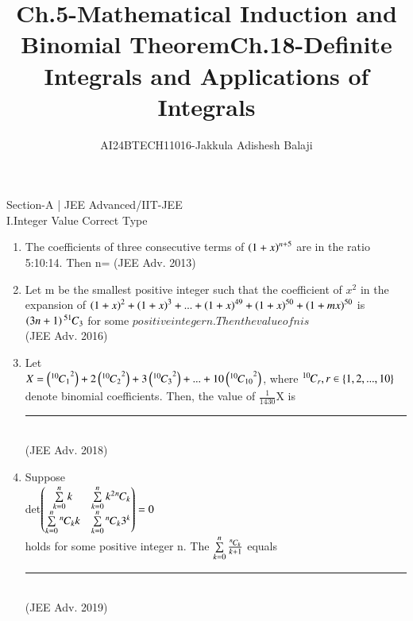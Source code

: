 \documentclass[journal]{IEEEtran}
\begin{document}

\title{Ch.5-Mathematical Induction and Binomial Theorem}
\author{AI24BTECH11016-Jakkula Adishesh Balaji}
{\let\newpage\relax\maketitle}
\renewcommand{\thefigure}{\theenumi}
\renewcommand{\thetable}{\theenumi}
\setlength{\intextsep}{10pt} %
\renewcommand{\thetable}{\theenumi}
Section-A | JEE Advanced/IIT-JEE\\
 I.Integer Value Correct Type
\begin{enumerate}
        \item
            The coefficients of three consecutive terms of $\left(1+x\right)^{n+5}$ are in the ratio 5:10:14. Then n=       
                     \hfill(JEE Adv. 2013)
        \item
            Let m be the smallest positive integer such that the coefficient of $x^{2}$ in the expansion of $\left(1+x\right)^{2} + \left(1+x\right)^{3} + ... + \left(1+x\right)^{49} + \left(1+x\right)^{50} + \left(1+mx\right)^{50}$ is $\left(3n+1\right) {{}^{51}\mkern-1muC_{3}}$ for some $positive integer n. Then the value of n is$ \\
                     \hfill(JEE Adv. 2016)
        \item
            Let \\ $X= \left({{}^{10}\mkern-1muC_{1}}^{2}\right)+2\left({{}^{10}\mkern-1muC_{2}}^{2}\right) + 3\left({{}^{10}\mkern-1muC_{3}}^{2}\right) + ... + 10\left({{}^{10}\mkern-1muC_{10}}^{2}\right)$, where ${{}^{10}\mkern-1muC_{r}} , r \in \left\{1,2,...,10\right\}$ denote binomial coefficients. Then, the value of $\frac{1}{1430}$X is \rule{10mm}{0.15mm} \\
                    \hfill(JEE Adv. 2018)
        \item
        Suppose \\
           det$\begin{pmatrix} \sum\limits_{k=0}^{n}k & \sum\limits_{k=0}^{n} k^{2} {{}^{n}\mkern-1muC_{k}} \\ \sum\limits_{k=0}^{n}{{}^{n}\mkern-1muC_{k}} k & \sum\limits_{k=0}^{n}{{}^{n}\mkern-1muC_{k}} 3^{k}\end{pmatrix}=0$ \\
holds for some positive integer n. The $\sum\limits_{k=0}^{n} \frac{{{}^{n}\mkern-1muC_{k}}}{k+1}$ equals \rule{10mm}{0.15mm} \\
                    \hfill(JEE Adv. 2019)
\end{enumerate}
\newpage
\title{Ch.18-Definite Integrals and Applications of Integrals}
\maketitle
\end{document}
